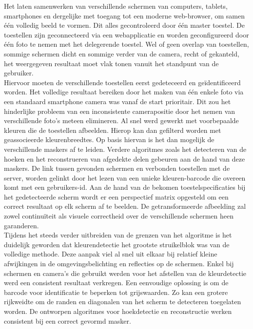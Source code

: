 Het laten samenwerken van verschillende schermen van computers, tablets, smartphones en dergelijke met toegang tot een moderne web-browser, om samen één volledig beeld te vormen. Dit alles gecontroleerd door één master toestel. De toestellen zijn geconnecteerd via een webapplicatie en worden geconfigureerd door één foto te nemen met het delegerende toestel. Wel of geen overlap van toestellen, sommige schermen dicht en sommige verder van de camera, recht of gekanteld, het weergegeven resultaat moet vlak tonen vanuit het standpunt van de gebruiker.\\[3mm]
Hiervoor moeten de verschillende toestellen eerst gedeteceerd en geïdentificeerd worden. Het volledige resultaat bereiken door het maken van één enkele foto via een standaard smartphone camera was vanaf de start prioritair. Dit zou het hinderlijke probleem van een inconsistente camerapositie door het nemen van verschillende foto’s meteen elimineren. Al snel werd gewerkt met voorbepaalde kleuren die de toestellen afbeelden. Hierop kan dan gefilterd worden met geassocieerde kleurenbreedtes. Op basis hiervan is het dan mogelijk de verschillende maskers af te leiden. Verdere algoritmes zoals het detecteren van de hoeken en het reconstrueren van afgedekte delen gebeuren aan de hand van deze maskers. De link tussen gevonden schermen en verbonden toestellen met de server, worden gelinkt door het lezen van een unieke kleuren-barcode die overeen komt met een gebruikers-id. Aan de hand van de bekomen toestelspecificaties bij  het gedetecteerde scherm wordt er een perspectief matrix opgesteld om een correct resultaat op elk scherm af te beelden. De getransformeerde afbeelding zal zowel continuïteit als visuele correctheid over de verschillende schermen heen garanderen.\\[3mm]
Tijdens het steeds verder uitbreiden van de grenzen van het algoritme is het duidelijk geworden dat kleurendetectie het grootste struikelblok was van de volledige methode. Deze aanpak viel al snel uit elkaar bij relatief kleine afwijkingen in de omgevingsbelichting en reflecties op de schermen. Enkel bij schermen en camera’s die gebruikt werden voor het afstellen van de kleurdetectie werd een consistent resultaat verkregen. Een eenvoudige oplossing is om de barcode voor identificatie te beperken tot grijswaarden. Zo kan een grotere rijkweidte om de randen en diagonalen van het scherm te detecteren toegelaten worden. De ontworpen algoritmes voor hoekdetectie en reconstructie werken consistent bij een correct gevormd masker.
